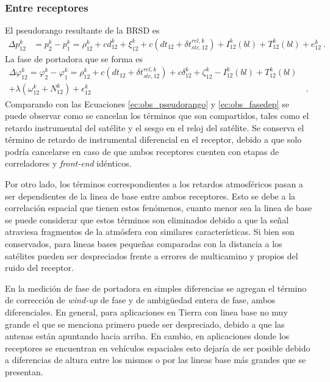 \documentclass[a4paper,12pt,oneside,onecolumn,final,openright]{book}%
\begin{document}
\subsubsection{Entre receptores}
	El pseudorango resultante de la BRSD es
\begin{align}\label{ec:BRSD_pr}
	\Delta p_{12}^k &= p_2^k - p_1^k = \rho_{12}^k +cd_{12}^k + \xi_{12}^k + c\left( dt_{12} + \delta t_{stc,12}^{rel,k} \right) + I_{12}^k(bl) + T_{12}^k(bl) + e_{12}^k \ .
\end{align}
	La fase de portadora que se forma es
\begin{align}\label{ec:BRSD_fdp}
	\Delta \varphi_{12}^k = \varphi_2^k - \varphi_1^k = \rho_{12}^k + c\left( dt_{12} + \delta t_{stc,12}^{rel,k} \right) + c\delta_{12}^k + \zeta_{12}^k - I_{12}^k(bl) + T_{12}^k(bl) &\\ + \lambda \left( \omega_{12}^k + N_{12}^k \right) + \epsilon_{12}^k & \ . \nonumber
\end{align}
	Comparando con las Ecuaciones \eqref{ec:obs_pseudorango} y \eqref{ec:obs_fasedep} se puede observar como se cancelan los términos que son compartidos, tales como el retardo instrumental del satélite y el sesgo en el reloj del satélite. Se conserva el término de retardo de instrumental diferencial en el receptor, debido a que solo podría cancelarse en caso de que ambos receptores cuenten con etapas de correladores y \textit{front-end} idénticos.
	
	 Por otro lado, los términos correspondientes a los retardos atmosféricos pasan a ser dependientes de la linea de base entre ambos receptores. Esto se debe a la correlación espacial que tienen estos fenómenos, cuanto menor sea la linea de base se puede considerar que estos términos son eliminados debido a que la señal atraviesa fragmentos de la atmósfera con similares características. Si bien son conservados, para lineas bases pequeñas comparadas con la distancia a los satélites pueden ser despreciados frente a errores de multicamino y propios del ruido del receptor.
	
	En la medición de fase de portadora en simples diferencias se agregan el término de corrección de \textit{wind-up} de fase y de ambigüedad entera de fase, ambos diferenciales. En general, para aplicaciones en Tierra con linea base no muy grande el que se menciona primero puede ser despreciado, debido a que las antenas están apuntando hacia arriba. En cambio, en aplicaciones donde los receptores se encuentran en vehículos espaciales esto dejaría de ser posible debido a diferencias de altura entre los mismos o por las lineas base más grandes que se presentan.
	
\end{document}
